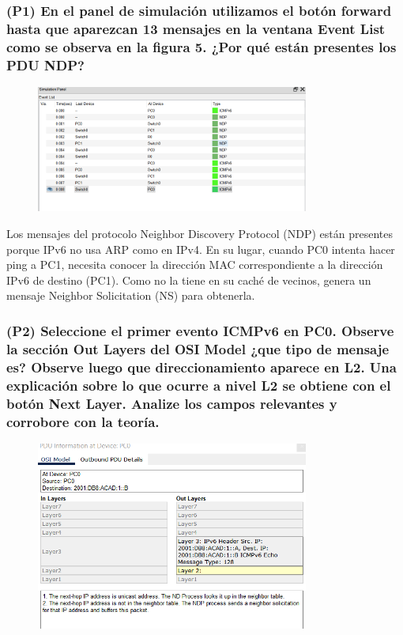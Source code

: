 \documentclass{article}
\begin{document}
\subsubsection*{(P1) En el panel de simulación utilizamos el botón forward hasta que aparezcan 13 mensajes en la ventana Event List como se observa en la figura 5. ¿Por qué están presentes los PDU NDP?}
\begin{figure}[h]
    \centering
    \includegraphics[width=0.8\textwidth]{12.png}
\end{figure}

Los mensajes del protocolo Neighbor Discovery Protocol (NDP) están presentes porque IPv6 no usa ARP como en IPv4. En su lugar, cuando PC0 intenta hacer ping a PC1, necesita conocer la dirección MAC correspondiente a la dirección IPv6 de destino (PC1). Como no la tiene en su caché de vecinos, genera un mensaje Neighbor Solicitation (NS) para obtenerla.

\subsubsection*{(P2) Seleccione el primer evento ICMPv6 en PC0. Observe la sección Out Layers del OSI Model ¿que tipo de mensaje es? Observe luego que direccionamiento aparece en L2. Una explicación sobre lo que ocurre a nivel L2 se obtiene con el botón Next Layer. Analize los campos relevantes y corrobore con la teoría.}
\begin{figure}[h]
    \centering
    \includegraphics[width=0.8\textwidth]{13.png}
\end{figure}
\end{document}
